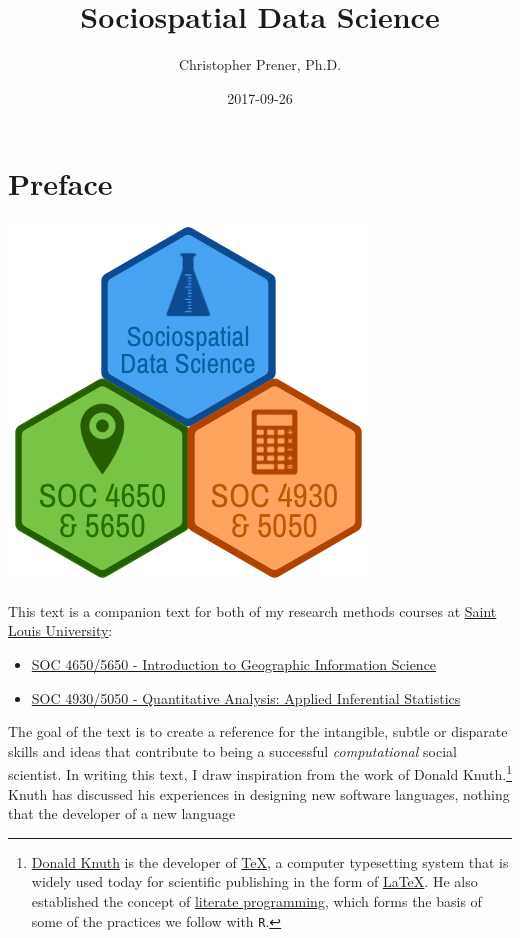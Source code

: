\documentclass[]{book}
\title{Sociospatial Data Science}
\author{Christopher Prener, Ph.D.}
\date{2017-09-26}
\providecommand{\tightlist}{%
  \setlength{\itemsep}{0pt}\setlength{\parskip}{0pt}}
\let\rmarkdownfootnote\footnote%
\def\footnote{\protect\rmarkdownfootnote}
\theoremstyle{definition}
\theoremstyle{definition}
\theoremstyle{definition}
\theoremstyle{remark}
\begin{document}
\maketitle

{
\setcounter{tocdepth}{1}
\tableofcontents
}
\chapter*{Preface}\label{preface}

\begin{center}\includegraphics[width=0.4\linewidth]{images/SSDSBookBanner} \end{center}

This text is a companion text for both of my research methods courses at
\href{https://slu.edu}{Saint Louis University}:

\begin{itemize}
\tightlist
\item
  \href{https://slu-soc5650.github.io}{SOC 4650/5650 - Introduction to
  Geographic Information Science}
\item
  \href{https://slu-soc5050.github.io}{SOC 4930/5050 - Quantitative
  Analysis: Applied Inferential Statistics}
\end{itemize}

The goal of the text is to create a reference for the intangible, subtle
or disparate skills and ideas that contribute to being a successful
\emph{computational} social scientist. In writing this text, I draw
inspiration from the work of Donald Knuth.\footnote{\href{https://en.wikipedia.org/wiki/Donald_Knuth}{Donald
  Knuth} is the developer of
  \href{https://en.wikipedia.org/wiki/TeX}{TeX}, a computer typesetting
  system that is widely used today for scientific publishing in the form
  of \href{https://en.wikipedia.org/wiki/LaTeX}{LaTeX}. He also
  established the concept of
  \href{https://en.wikipedia.org/wiki/Literate_programming}{literate
  programming}, which forms the basis of some of the practices we follow
  with \texttt{R}.} Knuth has discussed his experiences in designing new
software languages, nothing that the developer of a new language
\end{document}
